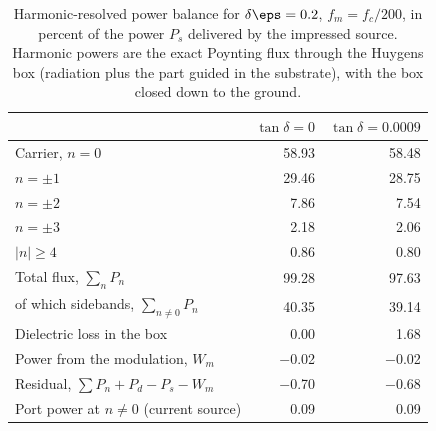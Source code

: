 \begin{table}[t]
\centering
\caption{Harmonic-resolved power balance for $\delta\eps=0.2$, $f_m=f_c/200$, in percent of the power $P_s$ delivered by the impressed source. Harmonic powers are the exact Poynting flux through the Huygens box (radiation plus the part guided in the substrate), with the box closed down to the ground.}
\label{tab:power}
\small
\begin{tabular}{@{}lrr@{}}
\toprule
 & $\tan\delta=0$ & $\tan\delta=0.0009$ \\
\midrule
Carrier, $n=0$ & 58.93 & 58.48 \\
$n=\pm1$ & 29.46 & 28.75 \\
$n=\pm2$ & 7.86 & 7.54 \\
$n=\pm3$ & 2.18 & 2.06 \\
$|n|\ge4$ & 0.86 & 0.80 \\
\midrule
Total flux, $\sum_nP_n$ & 99.28 & 97.63 \\
\quad of which sidebands, $\sum_{n\neq0}P_n$ & 40.35 & 39.14 \\
Dielectric loss in the box & 0.00 & 1.68 \\
Power from the modulation, $W_m$ & $-$0.02 & $-$0.02 \\
Residual, $\sum P_n+P_d-P_s-W_m$ & $-$0.70 & $-$0.68 \\
Port power at $n\neq0$ (current source) & 0.09 & 0.09 \\
\bottomrule
\end{tabular}
\end{table}
